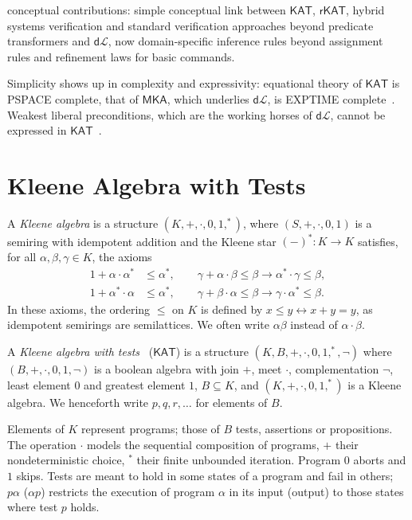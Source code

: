 \documentclass[envcountsames]{llncs}
\newcommand{\MKA}{\mathsf{MKA}}
\newcommand{\KAT}{\mathsf{KAT}}
\newcommand{\rKAT}{\mathsf{rKAT}}
\newcommand{\dL}{\mathsf{d}\mathcal{L}}
\begin{document}
conceptual contributions: simple conceptual link between $\KAT$,
$\rKAT$, hybrid systems verification and standard verification
approaches beyond predicate transformers and $\dL$, now
domain-specific inference rules beyond assignment rules and refinement
laws for basic commands. 

Simplicity shows up in complexity and expressivity: equational theory
of $\KAT$ is PSPACE complete, that of $\MKA$, which underlies $\dL$, is
EXPTIME complete~\cite{MollerS06}. Weakest liberal preconditions,
which are the working horses of $\dL$, cannot be expressed in $\KAT$~\cite{Struth16}.


\section{Kleene Algebra with Tests}\label{sec:kat} 

A \emph{Kleene algebra} is a structure $(K,+,\cdot,0,1,^\ast)$, where
$(S,+,\cdot,0,1)$ is a semiring with idempotent addition and the
Kleene star $(-)^\ast:K\to K$ satisfies, for all
$\alpha,\beta,\gamma\in K$, the axioms
\begin{align*} 
1+\alpha\cdot\alpha^\ast &\le \alpha^\ast, \qquad
  \gamma+\alpha\cdot
                                          \beta\le \beta\rightarrow \alpha^\ast \cdot \gamma\le \beta,\\
  1+\alpha^\ast\cdot\alpha &\le \alpha^\ast, \qquad \gamma+\beta\cdot
                             \alpha\le \beta\rightarrow \gamma\cdot
                             \alpha^\ast \le \beta.
\end{align*}
In these axioms, the ordering $\le$ on $K$ is defined by
$x\le y\leftrightarrow x+y=y$, as idempotent semirings are 
semilattices. We often write $\alpha\beta$ instead of
$\alpha\cdot\beta$.

A \emph{Kleene algebra with tests}~\cite{Kozen97} ($\KAT$) is a structure
$(K,B,+,\cdot,0,1,^\ast,\neg)$ where $(B,+,\cdot,0,1,\neg)$ is a
boolean algebra with join $+$, meet $\cdot$, complementation $\neg$,
least element $0$ and greatest element $1$, $B\subseteq K$, and
$(K,+,\cdot,0,1,^\ast)$ is a Kleene algebra. We henceforth write
$p,q,r,\dots$ for elements of $B$. 

Elements of $K$ represent programs; those of $B$ tests, assertions or
propositions.  The operation $\cdot$ models the sequential composition
of programs, $+$ their nondeterministic choice, $^\ast$ their finite
unbounded iteration. Program $0$ aborts and $1$ skips.  Tests are
meant to hold in some states of a program and fail in others;
$p\alpha$ ($\alpha p$) restricts the execution of program $\alpha$ in
its input (output) to those states where test $p$ holds.
\end{document}
